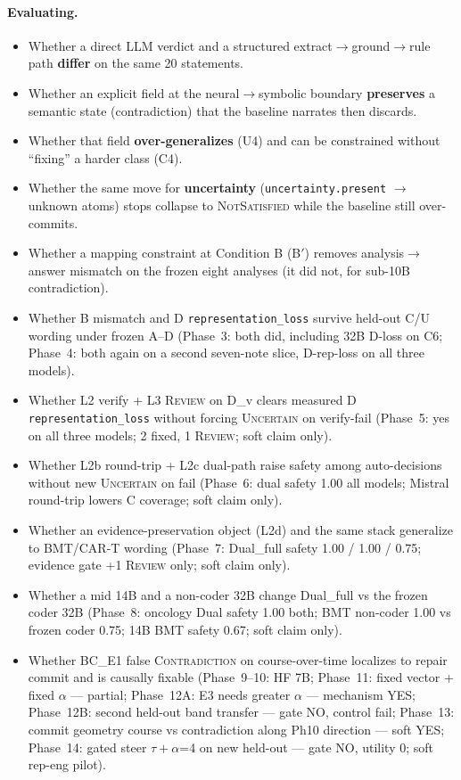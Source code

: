 \documentclass[11pt,a4paper]{article}
\newcommand{\nsat}{\textsc{NotSatisfied}}
\newcommand{\unc}{\textsc{Uncertain}}
\newcommand{\con}{\textsc{Contradiction}}
\newcommand{\rev}{\textsc{Review}}
\begin{document}
\paragraph{Evaluating.}
\begin{itemize}
  \item Whether a direct LLM verdict and a structured extract$\rightarrow$ground$\rightarrow$rule path \textbf{differ} on the same 20 statements.
  \item Whether an explicit field at the neural$\rightarrow$symbolic boundary \textbf{preserves} a semantic state (contradiction) that the baseline narrates then discards.
  \item Whether that field \textbf{over-generalizes} (U4) and can be constrained without ``fixing'' a harder class (C4).
  \item Whether the same move for \textbf{uncertainty} (\texttt{uncertainty.present} $\rightarrow$ unknown atoms) stops collapse to \nsat{} while the baseline still over-commits.
  \item Whether a mapping constraint at Condition B (B$'$) removes analysis$\rightarrow$answer mismatch on the frozen eight analyses (it did not, for sub-10B contradiction).
  \item Whether B mismatch and D \texttt{representation\_loss} survive held-out C/U wording under frozen A--D (Phase~3: both did, including 32B D-loss on C6; Phase~4: both again on a second seven-note slice, D-rep-loss on all three models).
  \item Whether L2 verify + L3 \rev{} on D\_v clears measured D \texttt{representation\_loss} without forcing \unc{} on verify-fail (Phase~5: yes on all three models; 2 fixed, 1 \rev; soft claim only).
  \item Whether L2b round-trip + L2c dual-path raise safety among auto-decisions without new \unc{} on fail (Phase~6: dual safety 1.00 all models; Mistral round-trip lowers C coverage; soft claim only).
  \item Whether an evidence-preservation object (L2d) and the same stack generalize to BMT/CAR-T wording (Phase~7: Dual\_full safety 1.00 / 1.00 / 0.75; evidence gate +1 \rev{} only; soft claim only).
  \item Whether a mid 14B and a non-coder 32B change Dual\_full vs the frozen coder 32B (Phase~8: oncology Dual safety 1.00 both; BMT non-coder 1.00 vs frozen coder 0.75; 14B BMT safety 0.67; soft claim only).
  \item Whether BC\_E1 false \con{} on course-over-time localizes to repair commit and is causally fixable (Phase~9--10: HF 7B; Phase~11: fixed vector + fixed $\alpha$ --- partial; Phase~12A: E3 needs greater $\alpha$ --- mechanism YES; Phase~12B: second held-out band transfer --- gate NO, control fail; Phase~13: commit geometry course vs contradiction along Ph10 direction --- soft YES; Phase~14: gated steer $\tau{+}\alpha$=4 on new held-out --- gate NO, utility 0; soft rep-eng pilot).
\end{itemize}
\end{document}
